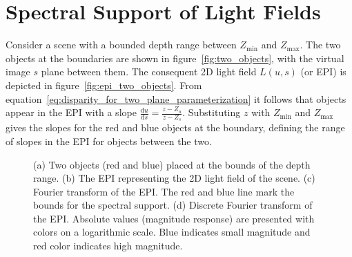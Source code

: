 \section{Spectral Support of Light Fields}
\label{sec:Spectral_Support_for_Light_Field}

Consider a scene with a bounded depth range between $Z_{\text{min}}$ and $Z_{\text{max}}$.
The two objects at the boundaries are shown in figure~\ref{fig:two_objects}, with the virtual image $s$ plane between them.
The consequent 2D light field $L(u, s)$ (or EPI) is depicted in figure~\ref{fig:epi_two_objects}.
From equation~\ref{eq:disparity_for_two_plane_parameterization} it follows that objects appear in the EPI with a slope $\frac{\textrm{d}u}{\textrm{d}s} = \frac{z - Z_u}{z - Z_s}$.
Substituting $z$ with $Z_\text{min}$ and $Z_\text{max}$ gives the slopes for the red and blue objects at the boundary, defining the range of slopes in the EPI for objects between the two.

\begin{figure}[tb]
	\begin{subfigure}{0.5\textwidth}
		\centering
		
		\caption{}
		\label{fig:two_objects}
		\vspace{0.5cm}
		
		\caption{}
		\label{fig:epi_fourier_transform_1}
	\end{subfigure}
	\begin{subfigure}{0.5\textwidth}
		\centering
		
		\caption{}
		\label{fig:epi_two_objects}
		\vspace{0.5cm}
		
		\caption{}
		\label{fig:epi_fourier_transform_2}
	\end{subfigure}
	\caption[Spectral analysis for light fields with bounded depth range]
			{(a) Two objects (red and blue) placed at the bounds of the depth range. 
			 (b) The EPI representing the 2D light field of the scene.
			 (c) Fourier transform of the EPI. 
				 The red and blue line mark the bounds for the spectral support.
			 (d) Discrete Fourier transform of the EPI. 
				 Absolute values (magnitude response) are presented with colors on a logarithmic scale.
				 Blue indicates small magnitude and red color indicates high magnitude.}
	\label{fig:spectral_analysis_for_light_field}
\end{figure}

